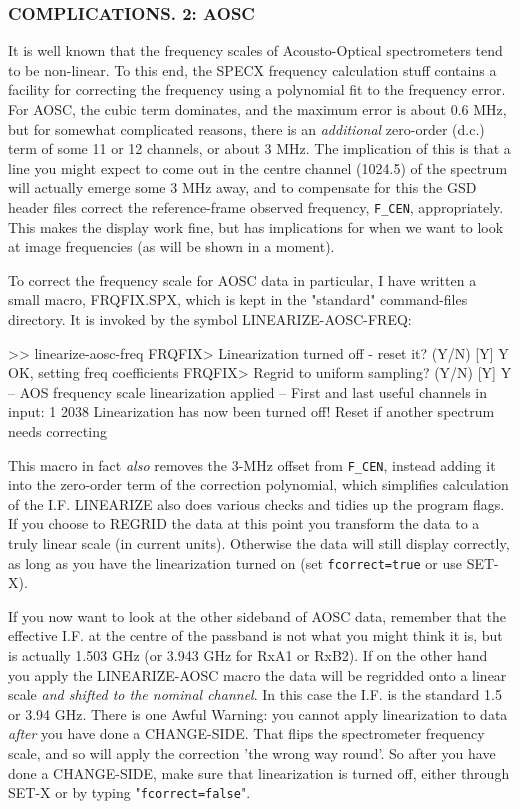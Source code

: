 \documentclass[twoside,11pt,nolof]{starlink}
\begin{document}
\subsubsection{COMPLICATIONS. 2: AOSC}

It is well known that the frequency scales of Acousto-Optical spectrometers
tend to be non-linear. To this end, the SPECX frequency calculation stuff
contains a facility for correcting the frequency using a polynomial fit to the
frequency error. For AOSC, the cubic term dominates, and the maximum error is
about 0.6 MHz, but for somewhat complicated reasons, there is an
\emph{additional} zero-order (d.c.) term of some 11 or 12 channels, or about 3
MHz. The implication of this is that a line you might expect to come out in
the centre channel (1024.5) of the spectrum will actually emerge some 3 MHz
away, and to compensate for this the GSD header files correct the
reference-frame observed frequency, \texttt{F\_CEN}, appropriately. This makes
the display work fine, but has implications for when we want to look at image
frequencies (as will be shown in a moment).

To correct the frequency scale for AOSC data in particular, I have written a
small macro, FRQFIX.SPX, which is kept in the "standard" command-files
directory. It is invoked by the symbol LINEARIZE-AOSC-FREQ:
\begin{terminalv}
>> linearize-aosc-freq
FRQFIX> Linearization turned off - reset it? (Y/N) [Y] Y
OK, setting freq coefficients
FRQFIX> Regrid to uniform sampling? (Y/N) [Y] Y
 -- AOS frequency scale linearization applied --
First and last useful channels in input:           1        2038
Linearization has now been turned off!
Reset if another spectrum needs correcting
\end{terminalv}

This macro in fact \emph{also} removes the 3-MHz offset from \texttt{F\_CEN},
instead adding it into the zero-order term of the correction polynomial, which
simplifies calculation of the I.F. LINEARIZE also does various checks and
tidies up the program flags. If you choose to REGRID the data at this point
you transform the data to a truly linear scale (in current units). Otherwise
the data will still display correctly, as long as you have the linearization
turned on (set \texttt{fcorrect=true} or use SET-X).

If you now want to look at the other sideband of AOSC data, remember that the
effective I.F. at the centre of the passband is not what you might think it
is, but is actually 1.503 GHz (or 3.943 GHz for RxA1 or RxB2). If on the other
hand you apply the LINEARIZE-AOSC macro the data will be regridded onto a
linear scale \emph{and shifted to the nominal channel}. In this case the
I.F. is the standard 1.5 or 3.94 GHz. There is one Awful Warning: you cannot
apply linearization to data \emph{after} you have done a CHANGE-SIDE. That
flips the spectrometer frequency scale, and so will apply the correction 'the
wrong way round'. So after you have done a CHANGE-SIDE, make sure that
linearization is turned off, either through SET-X or by typing
"\texttt{fcorrect=false}".
\end{document}
